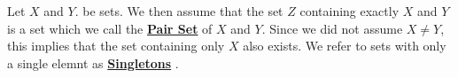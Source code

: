 \newcommand{\PairSet}[0]{
    \textbf{\hyperref[def:PairSet]{Pair Set}}
}
\newcommand{\PairSets}[0]{
    \textbf{\hyperref[def:PairSet]{Pair Sets}}
}
\newcommand{\Singleton}[0]{
    \textbf{\hyperref[def:PairSet]{Singleton}}
}
\newcommand{\Singletons}[0]{
    \textbf{\hyperref[def:PairSet]{Singletons}}
}\begin{df}
\label{def:PairSet}

\rm
    Let $X$ and $Y$. be sets. 
    We then assume that the set $Z$ 
    containing exactly $X$ and $Y$ is a 
    set which we call the \PairSet of $X$ and $Y$. 
    Since we did not assume
    $X \neq Y$, this implies that the 
    set containing only $X$ also exists. 
    We refer to sets with only a single elemnt 
    as \Singletons.
\end{df}
